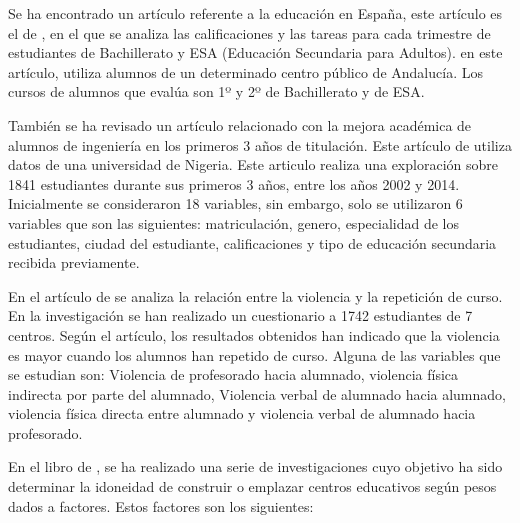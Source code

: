 Se ha encontrado un artículo referente a la educación en España, este artículo es el de , en el que se analiza las calificaciones y las tareas para cada trimestre de estudiantes de Bachillerato y ESA (Educación Secundaria para Adultos). \citeauthor{jose2016explotacion} en este artículo, utiliza alumnos de un determinado centro público de Andalucía. Los cursos de alumnos que evalúa son 1º y 2º de Bachillerato y de ESA. 

También se ha revisado un artículo relacionado con la mejora académica de alumnos de ingeniería en los primeros 3 años de titulación. Este artículo de  utiliza datos de una universidad de Nigeria. Este articulo realiza una exploración sobre 1841 estudiantes durante sus primeros 3 años, entre los años 2002 y 2014. Inicialmente se consideraron 18 variables, sin embargo, solo se utilizaron 6 variables que son las siguientes: matriculación, genero, especialidad de los estudiantes, ciudad del estudiante, calificaciones y tipo de educación secundaria recibida previamente.

En el artículo de \cite{alvarez2010violencia} se analiza la relación entre la violencia y la repetición de curso. En la investigación se han realizado un cuestionario a 1742 estudiantes de 7 centros. Según el artículo, los resultados obtenidos han indicado que la violencia es mayor cuando los alumnos han repetido de curso. Alguna de las variables que se estudian son: Violencia de profesorado hacia alumnado, violencia física indirecta por parte del alumnado, Violencia verbal de alumnado hacia alumnado, violencia física directa entre alumnado y violencia verbal de alumnado hacia profesorado.



En el libro de , se ha realizado una serie de investigaciones cuyo objetivo ha sido determinar la idoneidad de construir o emplazar centros educativos según pesos dados a factores. Estos factores son los siguientes:

